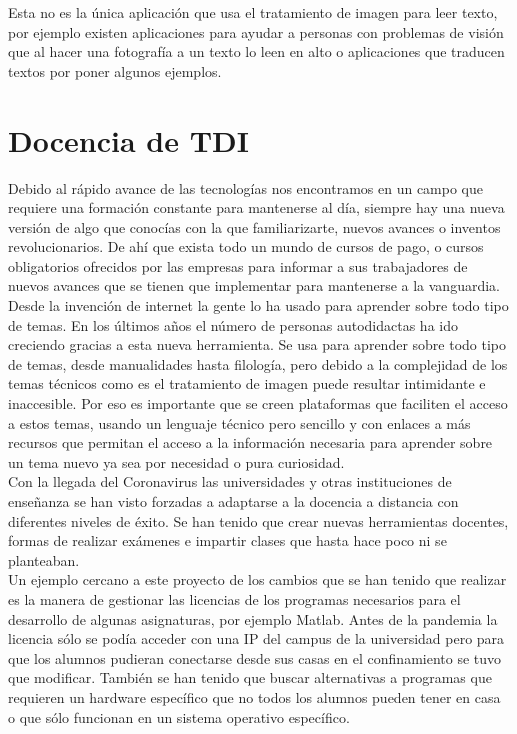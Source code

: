 \begin{itemize}
Esta no es la única aplicación que usa el tratamiento de imagen para leer texto, por ejemplo existen aplicaciones para ayudar a personas con problemas de visión que al hacer una fotografía a un texto lo leen en alto o aplicaciones que traducen textos por poner algunos ejemplos.\\

\end{itemize}

\section{Docencia de TDI}

Debido al rápido avance de las tecnologías nos encontramos en un campo que requiere una formación constante para mantenerse al día, siempre hay una nueva versión de algo que conocías con la que familiarizarte, nuevos avances o inventos revolucionarios. De ahí que exista todo un mundo de cursos de pago, o cursos obligatorios ofrecidos por las empresas para informar a sus trabajadores de nuevos avances que se tienen que implementar para mantenerse a la vanguardia.\\

Desde la invención de internet la gente lo ha usado para aprender sobre todo tipo de temas\cite{KUO201435}. En los últimos años el número de personas autodidactas ha ido creciendo gracias a esta nueva herramienta. Se usa para aprender sobre todo tipo de temas, desde manualidades hasta filología, pero debido a la complejidad de los temas técnicos como es el tratamiento de imagen puede resultar intimidante e inaccesible. Por eso es importante que se creen plataformas que faciliten el acceso a estos temas, usando un lenguaje técnico pero sencillo y con enlaces a más recursos que permitan el acceso a la información necesaria para aprender sobre un tema nuevo ya sea por necesidad o pura curiosidad.\\

Con la llegada del Coronavirus las universidades y otras instituciones de enseñanza se han visto forzadas a adaptarse a la docencia a distancia con diferentes niveles de éxito. Se han tenido que crear nuevas herramientas docentes, formas de realizar exámenes e impartir clases que hasta hace poco ni se planteaban.\\

Un ejemplo cercano a este proyecto de los cambios que se han tenido que realizar es la manera de gestionar las licencias de los programas necesarios para el desarrollo de algunas asignaturas, por ejemplo Matlab. Antes de la pandemia la licencia sólo se podía acceder con una IP del campus de la universidad pero para que los alumnos pudieran conectarse desde sus casas en el confinamiento se tuvo que modificar. También se han tenido que buscar alternativas a programas que requieren un hardware específico que no todos los alumnos pueden tener en casa o que sólo funcionan en un sistema operativo específico.\\

